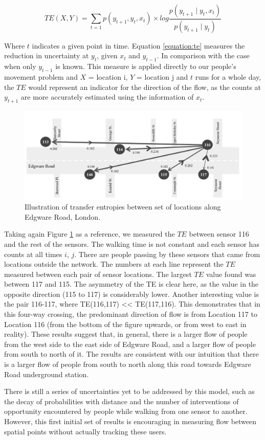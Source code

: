 \begin{equation} \label{equation:te}
  TE(X,Y) = \sum_{t=1} p(y_{t+1}, y_{t}, x_{t}) \times { log{ \frac{p(y_{t+1} \mid y_{t}, x_{t})}{p(y_{t+1} \mid y_{t})}} }
\end{equation}

Where $t$ indicates a given point in time.
Equation \ref{equation:te} measures the reduction in uncertainty at $y_{t}$, given $x_{t}$ and $y_{t-1}$.
In comparison with the case when only $y_{t-1}$ is known.
This measure is applied directly to our people's movement problem and $X$ = location i, $Y$ = location j and $t$ runs for a whole day, the $TE$ would represent an indicator for the direction of the flow, as the counts at $y_{t+1}$ are more accurately estimated using the information of $x_{t}$.

\begin{figure}
  \includegraphics[trim={0 0 0 0},clip]{images/applications-transfer-entropy.png}
  \caption{Illustration of transfer entropies between set of locations along Edgware Road, London.}
  \label{figure:applications:transent}
\end{figure}

Taking again Figure \ref{figure:applications:transent} as a reference, we measured the $TE$ between sensor 116 and the rest of the sensors.
The walking time is not constant and each sensor has counts at all times $i$, $j$.
There are people passing by these sensors that came from locations outside the network.
The numbers at each line represent the $TE$ measured between each pair of sensor locations.
The largest $TE$ value found was between 117 and 115.
The asymmetry of the TE is clear here, as the value in the opposite direction (115 to 117) is considerably lower.
Another interesting value is the pair 116-117, where TE(116,117) << TE(117,116).
This demonstrates that in this four-way crossing, the predominant direction of flow is from Location 117 to Location 116 (from the bottom of the figure upwards, or from west to east in reality). 
These results suggest that, in general, there is a larger flow of people from the west side to the east side of Edgware Road, and a larger flow of people from south to north of it. 
The results are consistent with our intuition that there is a larger flow of people from south to north along this road towards Edgware Road underground station.

There is still a series of uncertainties yet to be addressed by this model, such as the decay of probabilities with distance and the number of interventions of opportunity encountered by people while walking from one sensor to another.
However, this first initial set of results is encouraging in measuring flow between spatial points without actually tracking these users.
